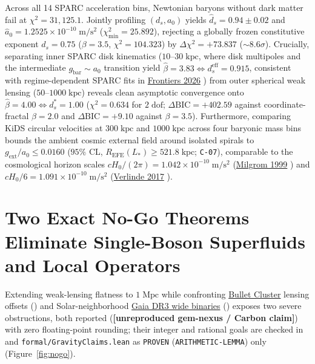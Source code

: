 \documentclass[11pt,letterpaper]{article}
\newcommand{\unrepro}{\textbf{\textcolor{red!60!black}{[unreproduced gem-nexus / Carbon claim]}}}
\begin{document}
Across all 14 SPARC acceleration bins, Newtonian baryons without dark matter fail at $\chi^2 = 31{,}125.1$. Jointly profiling $(d_s, a_0)$ yields $\hat{d}_s = 0.94 \pm 0.02$ and $\hat{a}_0 = 1.2525 \times 10^{-10}\;\mathrm{m/s^2}$ ($\chi^2_{\min} = 25.892$), rejecting a globally frozen constitutive exponent $d_s = 0.75$ ($\beta = 3.5$, $\chi^2 = 104.323$) by $\Delta\chi^2 = +73.837$ ($\sim 8.6\sigma$). Crucially, separating inner SPARC disk kinematics ($10\text{--}30\;\mathrm{kpc}$, where disk multipoles and the intermediate $g_{\mathrm{bar}} \sim a_0$ transition yield $\hat{\beta} = 3.83 \iff d_s^{\mathrm{eff}} = 0.915$, consistent with regime-dependent SPARC fits in \href{https://www.frontiersin.org/journals/astronomy-and-space-sciences/articles/10.3389/fspas.2026.1890948/full}{Frontiers 2026} \cite{Frontiers2026}) from outer spherical weak lensing ($50\text{--}1000\;\mathrm{kpc}$) reveals clean asymptotic convergence onto $\hat{\beta} = 4.00 \iff d_s^* = 1.00$ ($\chi^2 = 0.634$ for $2\;\mathrm{dof}$; $\Delta\mathrm{BIC} = +402.59$ against coordinate-fractal $\beta = 2.0$ and $\Delta\mathrm{BIC} = +9.10$ against $\beta = 3.5$). Furthermore, comparing KiDS circular velocities at $300\;\mathrm{kpc}$ and $1000\;\mathrm{kpc}$ across four baryonic mass bins bounds the ambient cosmic external field around isolated spirals to $g_{\mathrm{ext}}/a_0 \le 0.0160$ ($95\%$ CL, $R_{\mathrm{EFE}}(L_*) \ge 521.8\;\mathrm{kpc}$; \texttt{C-07}), comparable to the cosmological horizon scales $c H_0 / (2\pi) = 1.042\times 10^{-10}\;\mathrm{m/s^2}$ (\href{https://arxiv.org/abs/astro-ph/9805346}{Milgrom 1999} \cite{Milgrom1999}) and $c H_0 / 6 = 1.091\times 10^{-10}\;\mathrm{m/s^2}$ (\href{https://scipost.org/SciPostPhys.2.3.016}{Verlinde 2017} \cite{Verlinde2017}).

\section{Two Exact No-Go Theorems Eliminate Single-Boson Superfluids and Local Operators}

Extending weak-lensing flatness to $1\;\mathrm{Mpc}$ while confronting \href{https://arxiv.org/abs/astro-ph/0608407}{Bullet Cluster} lensing offsets (\cite{Clowe2006}) and Solar-neighborhood \href{https://arxiv.org/abs/2311.03436}{Gaia DR3 wide binaries} (\cite{Banik2024}) exposes two severe obstructions, both reported (\unrepro) with zero floating-point rounding; their integer and rational goals are checked in  and \texttt{formal/GravityClaims.lean} as \texttt{PROVEN} (\texttt{ARITHMETIC-LEMMA}) only (Figure~\ref{fig:nogo}).
\end{document}
